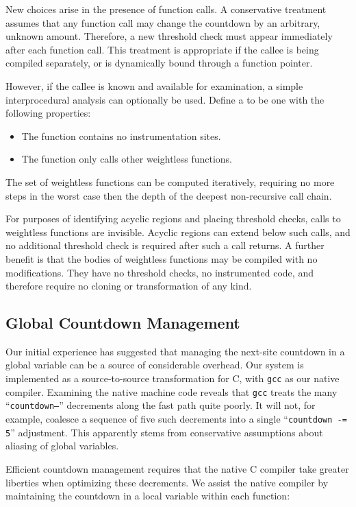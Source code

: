 New choices arise in the presence of function calls.  A conservative
treatment assumes that any function call may change the countdown by
an arbitrary, unknown amount.  Therefore, a new threshold check must
appear immediately after each function call.  This treatment is
appropriate if the callee is being compiled separately, or is
dynamically bound through a function pointer.

However, if the callee is known and available for examination, a
simple interprocedural analysis can optionally be used.  Define a
 to be one with the following properties:

\begin{itemize}
\item The function contains no instrumentation sites.
\item The function only calls other weightless functions.
\end{itemize}

The set of weightless functions can be computed iteratively, requiring
no more steps in the worst case then the depth of the deepest
non-recursive call chain.

For purposes of identifying acyclic regions and placing threshold
checks, calls to weightless functions are invisible.  Acyclic regions
can extend below such calls, and no additional threshold check is
required after such a call returns.  A further benefit is that the
bodies of weightless functions may be compiled with no modifications.
They have no threshold checks, no instrumented code, and therefore
require no cloning or transformation of any kind.

\subsection{Global Countdown Management}

Our initial experience has suggested that managing the next-site
countdown in a global variable can be a source of considerable
overhead.  Our system is implemented as a source-to-source
transformation for C, with \texttt{gcc} as our native compiler.
Examining the native machine code reveals that \texttt{gcc} treats the
many ``\texttt{countdown--}'' decrements along the fast path quite
poorly.  It will not, for example, coalesce a sequence of five such
decrements into a single ``\texttt{countdown -= 5}'' adjustment.  This
apparently stems from conservative assumptions about aliasing of
global variables.

Efficient countdown management requires that the native C compiler
take greater liberties when optimizing these decrements.  We assist
the native compiler by maintaining the countdown in a local variable
within each function:

